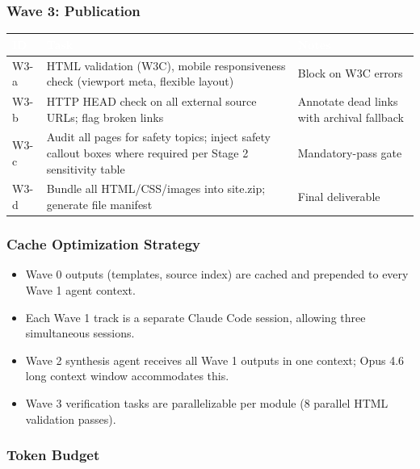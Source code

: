 \documentclass[11pt,letterpaper]{article}
\newcommand{\tableheader}[1]{\textbf{\sffamily\textcolor{white}{#1}}}
\begin{document}
\subsubsection{Wave 3: Publication}

\begin{center}
\begin{tabularx}{\textwidth}{L{2cm}XL{3cm}}
\toprule
{}
\tableheader{ID} & \tableheader{Task} & \tableheader{Notes} \\
\midrule
W3-a & HTML validation (W3C), mobile responsiveness check (viewport meta, flexible layout) & Block on W3C errors \\
W3-b & HTTP HEAD check on all external source URLs; flag broken links & Annotate dead links with archival fallback \\
W3-c & Audit all pages for safety topics; inject safety callout boxes where required per Stage 2 sensitivity table & Mandatory-pass gate \\
W3-d & Bundle all HTML/CSS/images into site.zip; generate file manifest & Final deliverable \\
\bottomrule
\end{tabularx}
\end{center}

\subsubsection{Cache Optimization Strategy}

\begin{itemize}[noitemsep]
  \item Wave 0 outputs (templates, source index) are cached and prepended to every Wave 1 agent context.
  \item Each Wave 1 track is a separate Claude Code session, allowing three simultaneous sessions.
  \item Wave 2 synthesis agent receives all Wave 1 outputs in one context; Opus 4.6 long context window accommodates this.
  \item Wave 3 verification tasks are parallelizable per module (8 parallel HTML validation passes).
\end{itemize}

\subsubsection{Token Budget}
\end{document}
